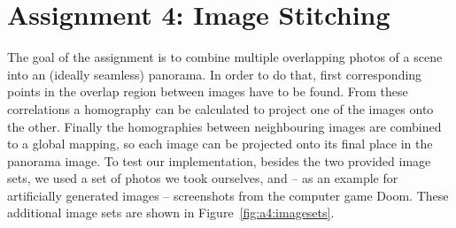 \section{Assignment 4: Image Stitching}
\label{sec:assignment4}


The goal of the assignment is to combine multiple overlapping photos of a scene into an (ideally seamless) panorama.
In order to do that, first corresponding points in the overlap region between images have to be found. From these correlations a homography can be calculated to project one of the images onto the other. Finally the homographies between neighbouring images are combined to a global mapping, so each image can be projected onto its final place in the panorama image. To test our implementation, besides the two provided image sets, we used a set of photos we took ourselves, and -- as an example for artificially generated images --  screenshots from the computer game Doom. These additional image sets are shown in Figure~\ref{fig:a4:imagesets}.

